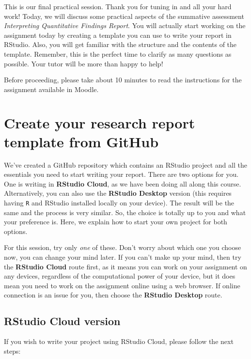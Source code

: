 \documentclass[
]{book}
\begin{document}
This is our final practical session. Thank you for tuning in and all your hard work! Today, we will discuss some practical aspects of the summative assessment \emph{Interpreting Quantitative Findings Report}. You will actually start working on the assignment today by creating a template you can use to write your report in RStudio. Also, you will get familiar with the structure and the contents of the template. Remember, this is the perfect time to clarify as many questions as possible. Your tutor will be more than happy to help!

Before proceeding, please take about 10 minutes to read the instructions for the assignment available in Moodle.

\hypertarget{create-your-research-report-template-from-github}{%
\section{Create your research report template from GitHub}\label{create-your-research-report-template-from-github}}

We've created a GitHub repository which contains an RStudio project and all the essentials you need to start writing your report. There are two options for you. One is writing in \textbf{RStudio Cloud}, as we have been doing all along this course. Alternatively, you can also use the \textbf{RStudio Desktop} version (this requires having \texttt{R} and RStudio installed locally on your device). The result will be the same and the process is very similar. So, the choice is totally up to you and what your preference is. Here, we explain how to start your own project for both options.

For this session, try only \emph{one} of these. Don't worry about which one you choose now, you can change your mind later. If you can't make up your mind, then try the \textbf{RStudio Cloud} route first, as it means you can work on your assignment on any devices, regardless of the computational power of your device, but it does mean you need to work on the assignment online using a web browser. If online connection is an issue for you, then choose the \textbf{RStudio Desktop} route.

\hypertarget{rstudio-cloud-version}{%
\subsection{RStudio Cloud version}\label{rstudio-cloud-version}}

If you wish to write your project using RStudio Cloud, please follow the next steps:
\end{document}
